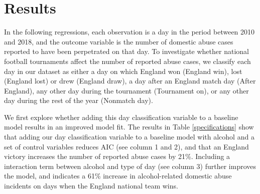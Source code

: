 \documentclass[12pt, letterpaper]{article}
\begin{document}
\clearpage


\section{Results}

In the following regressions, each observation is a day in the period between 2010 and 2018, and the outcome variable is the number of domestic abuse cases reported to have been perpetrated on that day. To investigate whether national football tournaments affect the number of reported abuse cases, we classify each day in our dataset as either a day on which England won (England win), lost (England lost) or drew (England draw), a day after an England match day (After England), any other day during the tournament (Tournament on), or any other day during the rest of the year (Nonmatch day). 

We first explore whether adding this day classification variable to a baseline model results in an improved model fit. The results in Table \ref{specifications} show that adding our day classification variable to a baseline model with alcohol and a set of control variables reduces AIC (see column 1 and 2), and that an England victory increases the number of reported abuse cases by 21\%. Including a interaction term between alcohol and type of day (see column 3) further improves the model, and indicates a 61\% increase in alcohol-related domestic abuse incidents on days when the England national team wins. 
\end{document}
